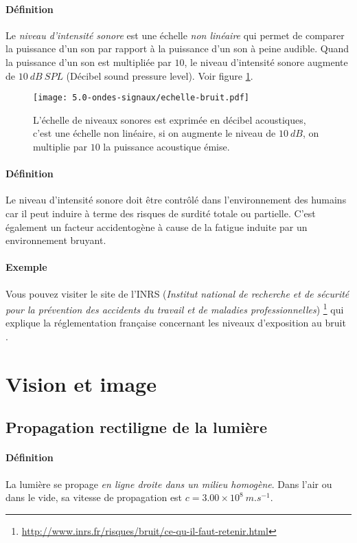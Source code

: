 \paragraph{Définition} Le \textit{niveau d'intensité sonore} est une échelle \textit{non linéaire} qui permet de comparer la puissance d'un son par rapport à la puissance d'un son à peine audible. Quand la puissance d'un son est multipliée par $10$, le niveau d'intensité sonore augmente de $10~dB~SPL$ (Décibel sound pressure level). Voir figure \ref{fig:echelle-bruit}.
\begin{figure}[h!]
  \begin{center}
      \texttt{[image: 5.0-ondes-signaux/echelle-bruit.pdf]}
  \end{center}
  \caption{L'échelle de niveaux sonores est exprimée en décibel acoustiques, c'est une échelle non linéaire, si on augmente le niveau de $10~dB$, on multiplie par $10$ la puissance acoustique émise.}
  \label{fig:echelle-bruit}
\end{figure}

\paragraph{Définition} Le niveau d'intensité sonore doit être contrôlé dans l'environnement des humains car il peut induire à terme des risques de surdité totale ou partielle. C'est également un facteur accidentogène à cause de la fatigue induite par un environnement bruyant.

\paragraph{Exemple} Vous pouvez visiter le site de l'INRS (\textit{Institut national de recherche et de sécurité pour la prévention des accidents du travail et de maladies professionnelles})
\footnote{\url{http://www.inrs.fr/risques/bruit/ce-qu-il-faut-retenir.html}} qui explique la réglementation française concernant les niveaux d'exposition au bruit . 

\section{Vision et image}
\subsection{Propagation rectiligne de la lumière}
\paragraph{Définition} La lumière se propage \textit{en ligne droite dans un milieu homogène}. Dans l'air ou dans le vide, sa vitesse de propagation est $c=3.00 \times 10^8~m.s^{-1}$.
